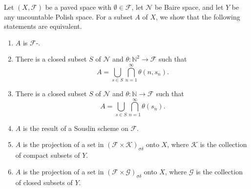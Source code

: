 \documentclass[12pt]{article}
\begin{document}

Let $(X,\mathcal{F})$ be a paved space with $\emptyset\in\mathcal{F}$, let $\mathcal{N}$ be Baire space, and let $Y$ be any uncountable Polish space. For a subset $A$ of $X$, we show that the following statements are equivalent.
\begin{enumerate}
\item\label{item:1} $A$ is $\mathcal{F}$-.
\item\label{item:2} There is a closed subset $S$ of $\mathcal{N}$ and $\theta\colon \mathbb{N}^2\to\mathcal{F}$ such that
\begin{equation*}
A=\bigcup_{s\in S}\bigcap_{n=1}^\infty \theta\left(n,s_n\right).
\end{equation*}
\item\label{item:3} There is a closed subset $S$ of $\mathcal{N}$ and $\theta\colon \mathbb{N}\to\mathcal{F}$ such that
\begin{equation*}
A=\bigcup_{s\in S}\bigcap_{n=1}^\infty \theta\left(s_n\right).
\end{equation*}
\item\label{item:4} $A$ is the result of a Souslin scheme on $\mathcal{F}$.
\item\label{item:5} $A$ is the projection of a set in $(\mathcal{F}\times\mathcal{K})_{\sigma\delta}$ onto $X$, where $\mathcal{K}$ is the collection of compact subsets of $Y$.
\item\label{item:6} $A$ is the projection of a set in $(\mathcal{F}\times\mathcal{G})_{\sigma\delta}$ onto $X$, where $\mathcal{G}$ is the collection of closed subsets of $Y$.
\end{enumerate}
\end{document}

